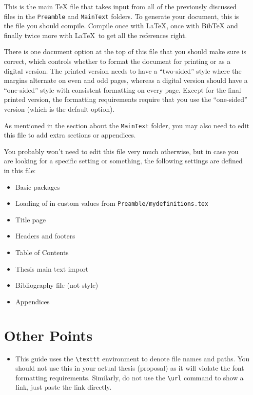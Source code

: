 This is the main TeX file that takes input from all of the previously discussed
files in the \texttt{Preamble} and \texttt{MainText} folders. To generate your
document, this is the file you should compile. Compile once with \LaTeX,
once with BibTeX and finally twice more with \LaTeX\ to get all the references right.

There is one document option at the top of this file that you should make
sure is correct, which controls whether to format the document for printing
or as a digital version. The printed version needs to have a ``two-sided''
style where the margins alternate on even and odd pages, whereas a digital
version should have a ``one-sided'' style with consistent formatting on every
page. Except for the final printed version, the formatting requirements
require that you use the ``one-sided'' version (which is the default option).

As mentioned in the section about the \texttt{MainText} folder, you may also
need to edit this file to add extra sections or appendices.

You probably won't need to edit this file very much otherwise, but in case
you are looking for a specific setting or something, the following settings
are defined in this file:
\begin{itemize}
    \item Basic packages
    \item Loading of in custom values from \texttt{Preamble/mydefinitions.tex}
    \item Title page
    \item Headers and footers
    \item Table of Contents
    \item Thesis main text import
    \item Bibliography file (not style)
    \item Appendices
\end{itemize}

\section{Other Points}

\begin{itemize}
    \item This guide uses the \texttt{\textbackslash texttt} environment to denote file
        names and paths. You should not use this in your actual thesis (proposal)
        as it will violate the font formatting requirements. Similarly,
        do not use the \texttt{\textbackslash url} command to show a link, just
        paste the link directly.
\end{itemize}

